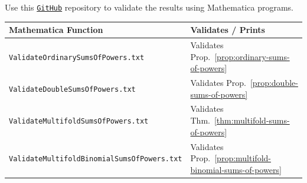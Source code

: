 Use this
\href{https://github.com/kolosovpetro/SumsOfPowersViaBackwardFiniteDifferencesAndNewtonFormula/tree/main/mathematica}
{\texttt{GitHub}}
repository to validate the results using Mathematica programs.
\\
\begin{center}
  \renewcommand{\arraystretch}{1.3}
  \begin{tabular}{ll}
    \toprule
    \textbf{Mathematica Function}  & \textbf{Validates / Prints} \\
    \midrule
    \texttt{ValidateOrdinarySumsOfPowers.txt}
    & Validates Prop.~\eqref{prop:ordinary-sums-of-powers}
    \\
    \texttt{ValidateDoubleSumsOfPowers.txt}
    & Validates Prop.~\eqref{prop:double-sums-of-powers}
    \\
    \texttt{ValidateMultifoldSumsOfPowers.txt}
    & Validates Thm.~\eqref{thm:multifold-sums-of-powers}
    \\
    \texttt{ValidateMultifoldBinomialSumsOfPowers.txt}
    & Validates Prop.~\eqref{prop:multifold-binomial-sums-of-powers}
    \\
    \bottomrule
  \end{tabular}
\end{center}
